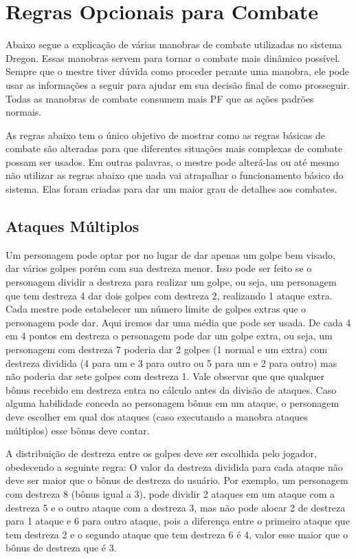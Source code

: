  

\section{Regras Opcionais para Combate}

Abaixo segue a explicação de várias manobras de combate utilizadas no sistema Dregon. Essas manobras servem para tornar o combate mais dinâmico possível. Sempre que o mestre tiver dúvida como proceder perante uma manobra, ele pode usar as informações a seguir para ajudar em sua decisão final de como prosseguir. Todas as manobras de combate consumem mais PF que as ações padrões normais. 

As regras abaixo tem o único objetivo de mostrar como as regras básicas de combate são alteradas para que diferentes situações mais complexas de combate possam ser usados. Em outras palavras, o mestre pode alterá-las ou até mesmo não utilizar as regras abaixo que nada vai atrapalhar o funcionamento básico do sistema. Elas foram criadas para dar um maior grau de detalhes aos combates.
	
\subsection{Ataques Múltiplos}

Um personagem pode optar por no lugar de dar apenas um golpe bem visado, dar vários golpes porém com sua destreza menor. Isso pode ser feito se o personagem dividir a destreza para realizar um golpe, ou seja, um personagem que tem destreza 4 dar dois golpes com destreza 2, realizando 1 ataque extra. Cada mestre pode estabelecer um número limite de golpes extras que o personagem pode dar. Aqui iremos dar uma média que pode ser usada. De cada 4 em 4 pontos em destreza o personagem pode dar um golpe extra, ou seja, um personagem com destreza 7 poderia dar 2 golpes (1 normal e um extra) com destreza dividida (4 para um e 3 para outro ou 5 para um e 2 para outro) mas não poderia dar sete golpes com destreza 1. Vale observar que que qualquer bônus recebido em destreza entra no cálculo antes da divisão de ataques. Caso alguma habilidade conceda ao personagem bônus em um ataque, o personagem deve escolher em qual dos ataques (caso executando a manobra ataques múltiplos) esse bônus deve contar.

A distribuição de destreza entre os golpes deve ser escolhida pelo jogador, obedecendo a seguinte regra: O valor da destreza dividida para cada ataque não deve ser maior que o bônus de destreza do usuário. Por exemplo, um personagem com destreza 8 (bônus igual a 3), pode dividir 2 ataques em um ataque com a destreza 5 e o outro ataque com a destreza 3, mas não pode alocar 2 de destreza para 1 ataque e 6 para outro ataque, pois a diferença entre o primeiro ataque que tem destreza 2 e o segundo ataque que tem destreza 6 é 4, valor esse maior que o bônus de destreza que é 3.

